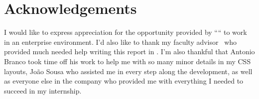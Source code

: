 


% 
% 
% 

\begingroup
\let\clearpage\relax
\let\cleardoublepage\relax
\let\cleardoublepage\relax
\chapter*{Acknowledgements}

I would like to express appreciation for the opportunity provided by ``\company`` to work
in an enterprise environment. I'd also like to thank my faculty advisor \myProf\ 
who provided much needed help writing this report in \LaTeXe. I'm also thankful that 
Antonio Branco took time off his work to help me with so many minor details in my CSS
layouts, João Sousa who assisted me in every step along the development, as well as everyone
else in the company who provided me with everything I needed to succeed in my internship.\\



\endgroup



